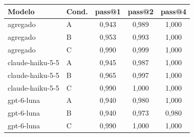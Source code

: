 \begin{tabular}{llccc}
\toprule
Modelo & Cond. & pass@1 & pass@2 & pass@4 \\
\midrule
agregado & A & 0{,}943 & 0{,}989 & 1{,}000 \\
agregado & B & 0{,}953 & 0{,}993 & 1{,}000 \\
agregado & C & 0{,}990 & 0{,}999 & 1{,}000 \\
\midrule
claude-haiku-5-5 & A & 0{,}945 & 0{,}987 & 1{,}000 \\
claude-haiku-5-5 & B & 0{,}965 & 0{,}997 & 1{,}000 \\
claude-haiku-5-5 & C & 0{,}990 & 1{,}000 & 1{,}000 \\
\midrule
gpt-6-luna & A & 0{,}940 & 0{,}980 & 1{,}000 \\
gpt-6-luna & B & 0{,}940 & 0{,}973 & 0{,}980 \\
gpt-6-luna & C & 0{,}990 & 1{,}000 & 1{,}000 \\
\bottomrule
\end{tabular}
